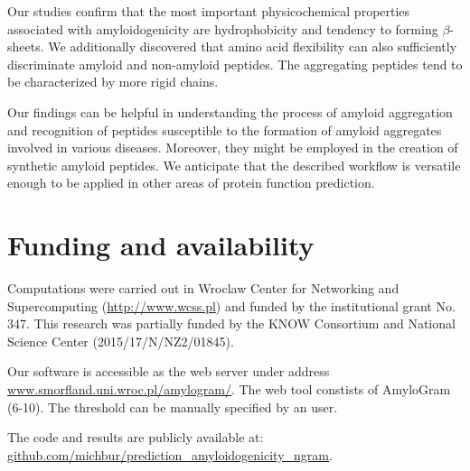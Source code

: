 \documentclass[fleqn,10pt,twoside]{gcb15submission}
\begin{document}
Our studies confirm that the most important physicochemical properties associated 
with amyloidogenicity are hydrophobicity and tendency to forming $\beta$-sheets.  
We additionally discovered that amino acid flexibility can also sufficiently 
discriminate amyloid and non-amyloid peptides. The aggregating peptides tend to
be characterized by more rigid chains.

Our findings can be helpful in understanding the process of amyloid aggregation 
and recognition of peptides susceptible to the formation of amyloid aggregates involved 
in various diseases. Moreover, they might be employed in the creation of synthetic 
amyloid peptides. We anticipate that the described workflow is versatile enough to 
be applied in other areas of protein function prediction.


\section*{Funding and availability}

Computations were carried out in Wroclaw Center for Networking 
and Supercomputing (\url{http://www.wcss.pl}) and funded by the
institutional grant No. 347. This research was partially funded by the KNOW Consortium and
National Science Center (2015/17/N/NZ2/01845).

Our software is accessible as the web server under address 
\url{www.smorfland.uni.wroc.pl/amylogram/}. The web tool constists of AmyloGram 
(6-10). The threshold can be manually specified by an user.

The code and results are publicly available at: \url{github.com/michbur/prediction_amyloidogenicity_ngram}.


\end{document}
